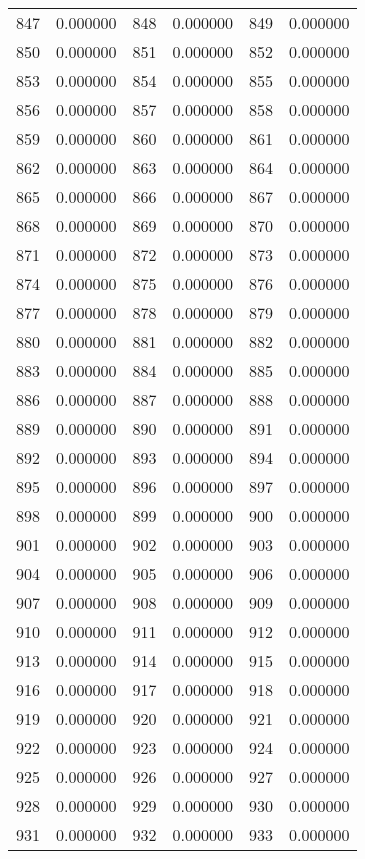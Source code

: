 \documentclass[12pt]{article}
\begin{document}
\begin{longtable}{@{}cc|cc|cc@{}}
847 & 0.000000 & 848 & 0.000000 & 849 & 0.000000 \\
850 & 0.000000 & 851 & 0.000000 & 852 & 0.000000 \\
853 & 0.000000 & 854 & 0.000000 & 855 & 0.000000 \\
856 & 0.000000 & 857 & 0.000000 & 858 & 0.000000 \\
859 & 0.000000 & 860 & 0.000000 & 861 & 0.000000 \\
862 & 0.000000 & 863 & 0.000000 & 864 & 0.000000 \\
865 & 0.000000 & 866 & 0.000000 & 867 & 0.000000 \\
868 & 0.000000 & 869 & 0.000000 & 870 & 0.000000 \\
871 & 0.000000 & 872 & 0.000000 & 873 & 0.000000 \\
874 & 0.000000 & 875 & 0.000000 & 876 & 0.000000 \\
877 & 0.000000 & 878 & 0.000000 & 879 & 0.000000 \\
880 & 0.000000 & 881 & 0.000000 & 882 & 0.000000 \\
883 & 0.000000 & 884 & 0.000000 & 885 & 0.000000 \\
886 & 0.000000 & 887 & 0.000000 & 888 & 0.000000 \\
889 & 0.000000 & 890 & 0.000000 & 891 & 0.000000 \\
892 & 0.000000 & 893 & 0.000000 & 894 & 0.000000 \\
895 & 0.000000 & 896 & 0.000000 & 897 & 0.000000 \\
898 & 0.000000 & 899 & 0.000000 & 900 & 0.000000 \\
901 & 0.000000 & 902 & 0.000000 & 903 & 0.000000 \\
904 & 0.000000 & 905 & 0.000000 & 906 & 0.000000 \\
907 & 0.000000 & 908 & 0.000000 & 909 & 0.000000 \\
910 & 0.000000 & 911 & 0.000000 & 912 & 0.000000 \\
913 & 0.000000 & 914 & 0.000000 & 915 & 0.000000 \\
916 & 0.000000 & 917 & 0.000000 & 918 & 0.000000 \\
919 & 0.000000 & 920 & 0.000000 & 921 & 0.000000 \\
922 & 0.000000 & 923 & 0.000000 & 924 & 0.000000 \\
925 & 0.000000 & 926 & 0.000000 & 927 & 0.000000 \\
928 & 0.000000 & 929 & 0.000000 & 930 & 0.000000 \\
931 & 0.000000 & 932 & 0.000000 & 933 & 0.000000 \\

\end{longtable}
\end{document}
